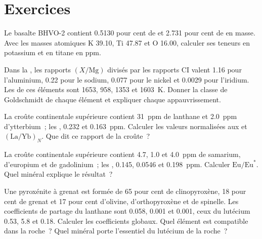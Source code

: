 \section{Exercices}

\begin{exercise}[$\star$]\label{exo:b2:elements-in-the-earth:1}
Le basalte BHVO-2 contient 0.5130 pour cent de  et 2.731 pour
cent de  en masse. Avec les masses atomiques K 39.10, Ti 47.87
et O 16.00, calculer ses teneurs en potassium et en titane en ppm.
\end{exercise}

\begin{exercise}[$\star$]\label{exo:b2:elements-in-the-earth:2}
Dans la , les rapports $(X/\mathrm{Mg})$ divisés
par les rapports CI valent 1.16 pour l'aluminium, 0.22 pour le sodium, 0.077
pour le nickel et 0.0029 pour l'iridium. Les 
de ces éléments sont 1653, 958, 1353 et \qty{1603}{K}. Donner la classe
de Goldschmidt de chaque élément et expliquer chaque appauvrissement.
\end{exercise}

\begin{exercise}[$\star$]\label{exo:b2:elements-in-the-earth:3}
La croûte continentale supérieure contient \qty{31}{ppm} de lanthane
et \qty{2.0}{ppm} d'ytterbium~; les , 0.232 et
\qty{0.163}{ppm}. Calculer les valeurs normalisées aux  et
$(\mathrm{La}/\mathrm{Yb})_N$. Que dit ce rapport de la croûte~?
\end{exercise}

\begin{exercise}[$\star$]\label{exo:b2:elements-in-the-earth:4}
La croûte continentale supérieure contient 4.7, 1.0 et \qty{4.0}{ppm} de samarium,
d'europium et de gadolinium~; les , 0.145, 0.0546 et \qty{0.198}{ppm}.
Calculer $\mathrm{Eu}/\mathrm{Eu}^*$. Quel minéral explique le résultat~?
\end{exercise}

\begin{exercise}[$\star\star$]\label{exo:b2:elements-in-the-earth:5}
Une pyroxénite à grenat est formée de 65 pour cent de clinopyroxène, 18 pour
cent de grenat et 17 pour cent d'olivine, d'orthopyroxène et de spinelle. Les
coefficients de partage du lanthane sont 0.058, 0.001 et 0.001, ceux du lutécium
0.53, 5.8 et 0.18. Calculer les coefficients globaux. Quel élément est compatible
dans la roche~? Quel minéral porte l'essentiel du lutécium de la roche~?
\end{exercise}

